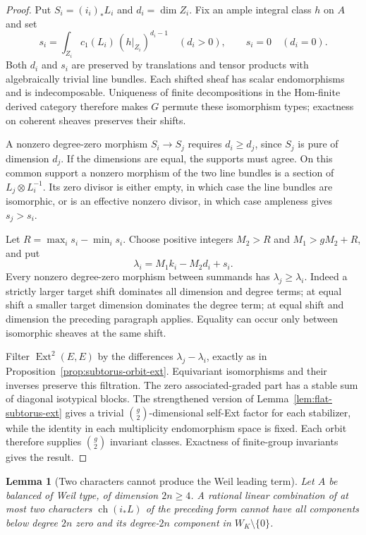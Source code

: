 \documentclass[11pt]{article}
\newtheorem{lemma}[theorem]{Lemma}
\theoremstyle{definition}
\theoremstyle{remark}
\begin{document}
\begin{proof}
Put $S_i=(i_i)_*L_i$ and $d_i=\dim Z_i$.  Fix an ample integral
class $h$ on $A$ and set
\[
 s_i=\int_{Z_i} c_1(L_i)\,(h|_{Z_i})^{d_i-1}
 \quad(d_i>0),\qquad s_i=0\quad(d_i=0).
\]
Both $d_i$ and $s_i$ are preserved by translations and tensor
products with algebraically trivial line bundles.
Each shifted sheaf has scalar endomorphisms and is indecomposable.
Uniqueness of finite decompositions in the Hom-finite derived
category therefore makes $G$ permute these isomorphism types;
exactness on coherent sheaves preserves their shifts.

A nonzero degree-zero morphism $S_i\to S_j$ requires
$d_i\geq d_j$, since $S_j$ is pure of dimension $d_j$.  If the
dimensions are equal, the supports must agree.  On this common
support a nonzero morphism of the two line bundles is a section
of $L_j\otimes L_i^{-1}$.  Its zero divisor is either empty,
in which case the line bundles are isomorphic, or is an effective
nonzero divisor, in which case ampleness gives $s_j>s_i$.

Let $R=\max_i s_i-\min_i s_i$.  Choose positive integers
$M_2>R$ and $M_1>gM_2+R$, and put
\[
 \lambda_i=M_1k_i-M_2d_i+s_i.
\]
Every nonzero degree-zero morphism between summands has
$\lambda_j\geq\lambda_i$.  Indeed a strictly larger target
shift dominates all dimension and degree terms; at equal shift
a smaller target dimension dominates the degree term; at equal
shift and dimension the preceding paragraph applies.  Equality
can occur only between isomorphic sheaves at the same shift.

Filter $\operatorname{Ext}^2(E,E)$ by the differences
$\lambda_j-\lambda_i$, exactly as in
Proposition~\ref{prop:subtorus-orbit-ext}.  Equivariant
isomorphisms and their inverses preserve this filtration.
The zero associated-graded part has a stable sum of diagonal
isotypical blocks.  The strengthened version of
Lemma~\ref{lem:flat-subtorus-ext} gives a trivial
$\binom g2$-dimensional self-Ext factor for each stabilizer,
while the identity in each multiplicity endomorphism space is
fixed.  Each orbit therefore supplies $\binom g2$ invariant
classes.  Exactness of finite-group invariants gives the result.
\end{proof}

\begin{lemma}[Two characters cannot produce the Weil leading term]
\label{lem:two-subtorus-characters}
Let $A$ be balanced of Weil type, of dimension $2n\geq4$.
A rational linear combination of at most two characters
$\operatorname{ch}(i_*L)$ of the preceding form cannot have all
components below degree $2n$ zero and its degree-$2n$ component
in $W_K\setminus\{0\}$.
\end{lemma}
\end{document}
